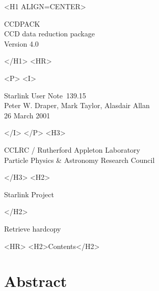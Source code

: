 \documentclass[twoside,11pt]{article}
\newcommand{\stardoccategory}  {Starlink User Note}
\newcommand{\stardocsource}    {sun\stardocnumber}
\newcommand{\stardocnumber}    {139.15}
\newcommand{\stardocauthors}   {Peter W. Draper, Mark Taylor, Alasdair Allan}
\newcommand{\stardocdate}      {26 March 2001}
\newcommand{\stardoctitle}     {CCDPACK}
\newcommand{\stardoconeline}   {CCD data reduction package}
\newcommand{\stardocversion}   {Version 4.0}
\newcommand{\htmladdnormallink}[2]{#1}
\newcommand{\htmladdimg}[1]{}
\newcommand{\htmlref}[2]{#1}
\newcommand{\htmladdtonavigation}[1]{}
\newcommand{\xlabel}[1]{}
\renewcommand{\_}{\texttt{\symbol{95}}}
\begin{document}
\begin{htmlonly}
   \xlabel{}
   \begin{rawhtml} <H1 ALIGN=CENTER> \end{rawhtml}
      \stardoctitle\\
      \stardoconeline \\
      \stardocversion

      \htmladdimg{main.gif}
   \begin{rawhtml} </H1> <HR> \end{rawhtml}


   \begin{rawhtml} <P> <I> \end{rawhtml}
   \stardoccategory\ \stardocnumber \\
   \stardocauthors \\
   \stardocdate
   \begin{rawhtml} </I> </P> <H3> \end{rawhtml}
      \htmladdnormallink{CCLRC}{http://www.cclrc.ac.uk} /
      \htmladdnormallink{Rutherford Appleton Laboratory}
                        {http://www.cclrc.ac.uk/ral} \\
      \htmladdnormallink{Particle Physics \& Astronomy Research Council}
                        {http://www.pparc.ac.uk} \\
   \begin{rawhtml} </H3> <H2> \end{rawhtml}
      \htmladdnormallink{Starlink Project}{http://star-www.rl.ac.uk/}
   \begin{rawhtml} </H2> \end{rawhtml}
   \htmladdnormallink{\htmladdimg{source.gif} Retrieve hardcopy}
      {http://star-www.rl.ac.uk/cgi-bin/hcserver?\stardocsource}\\

  \label{stardoccontents}
  \begin{rawhtml} 
    <HR>
    <H2>Contents</H2>
  \end{rawhtml}
  \htmladdtonavigation{\htmlref{\htmladdimg{contents_motif.gif}}
        {stardoccontents}}

  \section{\xlabel{abstract}Abstract}
\end{htmlonly}
\end{document}
